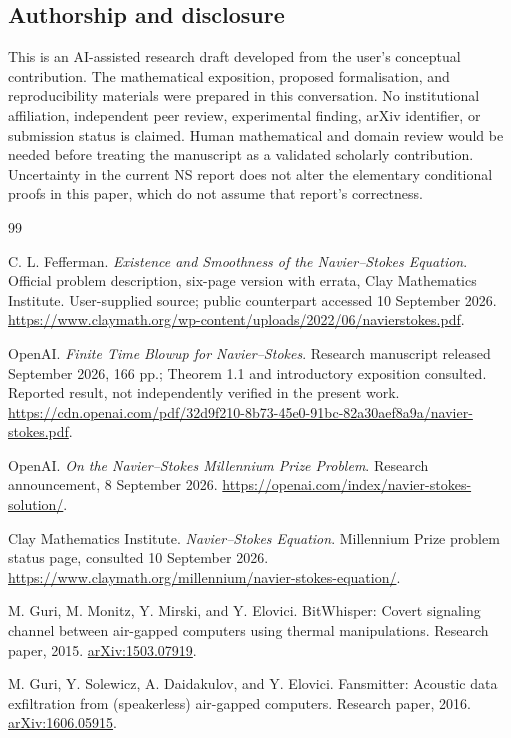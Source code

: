 \documentclass[11pt,a4paper]{article}
\theoremstyle{definition}
\theoremstyle{remark}
\begin{document}
\subsection*{Authorship and disclosure}
This is an AI-assisted research draft developed from the user's conceptual contribution. The mathematical exposition, proposed formalisation, and reproducibility materials were prepared in this conversation. No institutional affiliation, independent peer review, experimental finding, arXiv identifier, or submission status is claimed. Human mathematical and domain review would be needed before treating the manuscript as a validated scholarly contribution. Uncertainty in the current NS report does not alter the elementary conditional proofs in this paper, which do not assume that report's correctness.

\begin{thebibliography}{99}
\raggedright
{}
C. L. Fefferman. \emph{Existence and Smoothness of the Navier--Stokes Equation}. Official problem description, six-page version with errata, Clay Mathematics Institute. User-supplied source; public counterpart accessed 10 September 2026. \url{https://www.claymath.org/wp-content/uploads/2022/06/navierstokes.pdf}.

OpenAI. \emph{Finite Time Blowup for Navier--Stokes}. Research manuscript released September 2026, 166 pp.; Theorem 1.1 and introductory exposition consulted. Reported result, not independently verified in the present work. \url{https://cdn.openai.com/pdf/32d9f210-8b73-45e0-91bc-82a30aef8a9a/navier-stokes.pdf}.

OpenAI. \emph{On the Navier--Stokes Millennium Prize Problem}. Research announcement, 8 September 2026. \url{https://openai.com/index/navier-stokes-solution/}.

Clay Mathematics Institute. \emph{Navier--Stokes Equation}. Millennium Prize problem status page, consulted 10 September 2026. \url{https://www.claymath.org/millennium/navier-stokes-equation/}.

M. Guri, M. Monitz, Y. Mirski, and Y. Elovici. BitWhisper: Covert signaling channel between air-gapped computers using thermal manipulations. Research paper, 2015. \href{https://arxiv.org/abs/1503.07919}{arXiv:1503.07919}.

M. Guri, Y. Solewicz, A. Daidakulov, and Y. Elovici. Fansmitter: Acoustic data exfiltration from (speakerless) air-gapped computers. Research paper, 2016. \href{https://arxiv.org/abs/1606.05915}{arXiv:1606.05915}.


\end{thebibliography}
\end{document}
